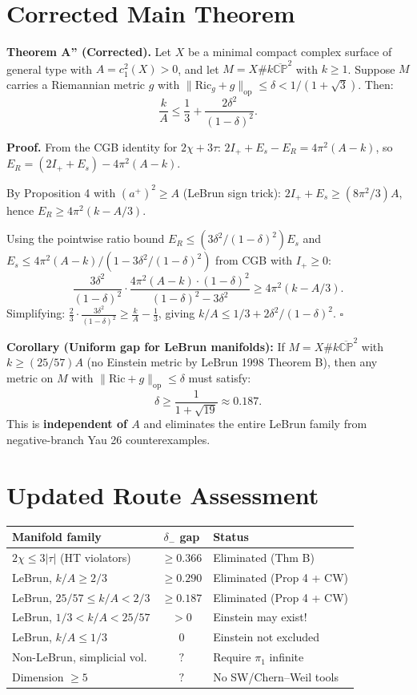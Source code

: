 \section{Corrected Main Theorem}

\textbf{Theorem A'' (Corrected).} Let $X$ be a minimal compact complex surface of general type 
with $A = c_1^2(X) > 0$, and let $M = X \# k\overline{\mathbb{CP}}^2$ with $k \geq 1$.
Suppose $M$ carries a Riemannian metric $g$ with 
$\|\mathrm{Ric}_g + g\|_{\mathrm{op}} \leq \delta < 1/(1+\sqrt{3})$.
Then:
\[
\boxed{\frac{k}{A} \leq \frac{1}{3} + \frac{2\delta^2}{(1-\delta)^2}}.
\]

\textbf{Proof.} From the CGB identity for $2\chi + 3\tau$:
$2I_+ + E_s - E_R = 4\pi^2(A-k)$, so $E_R = (2I_+ + E_s) - 4\pi^2(A-k)$.

By Proposition 4 with $(a^+)^2 \geq A$ (LeBrun sign trick):
$2I_+ + E_s \geq (8\pi^2/3)A$, hence $E_R \geq 4\pi^2(k - A/3)$.

Using the pointwise ratio bound $E_R \leq (3\delta^2/(1-\delta)^2)E_s$
and $E_s \leq 4\pi^2(A-k)/(1-3\delta^2/(1-\delta)^2)$ from CGB with $I_+ \geq 0$:
\[
\frac{3\delta^2}{(1-\delta)^2} \cdot \frac{4\pi^2(A-k) \cdot (1-\delta)^2}{(1-\delta)^2-3\delta^2} 
\geq 4\pi^2(k-A/3).
\]
Simplifying: $\frac{2}{3}\cdot\frac{3\delta^2}{(1-\delta)^2} \geq \frac{k}{A} - \frac{1}{3}$,
giving $k/A \leq 1/3 + 2\delta^2/(1-\delta)^2$. $\square$

\textbf{Corollary (Uniform gap for LeBrun manifolds):}
If $M = X \# k\overline{\mathbb{CP}}^2$ with $k \geq (25/57)A$ (no Einstein metric by 
LeBrun 1998 Theorem B), then any metric on $M$ with $\|\mathrm{Ric}+g\|_{\mathrm{op}} \leq \delta$ 
must satisfy:
\[
\delta \geq \frac{1}{1+\sqrt{19}} \approx 0.187.
\]
This is \textbf{independent of $A$} and eliminates the entire LeBrun family from 
negative-branch Yau 26 counterexamples.


\section{Updated Route Assessment}

\begin{center}
\begin{tabular}{|l|c|l|}
\hline
\textbf{Manifold family} & \textbf{$\delta_-$ gap} & \textbf{Status} \\
\hline
$2\chi \leq 3|\tau|$ (HT violators) & $\geq 0.366$ & Eliminated (Thm B) \\
LeBrun, $k/A \geq 2/3$ & $\geq 0.290$ & Eliminated (Prop 4 + CW) \\
LeBrun, $25/57 \leq k/A < 2/3$ & $\geq 0.187$ & Eliminated (Prop 4 + CW) \\
LeBrun, $1/3 < k/A < 25/57$ & $> 0$ & Einstein may exist! \\
LeBrun, $k/A \leq 1/3$ & $0$ & Einstein not excluded \\
\hline
Non-LeBrun, simplicial vol. & $?$ & Require $\pi_1$ infinite \\
Dimension $\geq 5$ & $?$ & No SW/Chern--Weil tools \\
\hline
\end{tabular}
\end{center}

